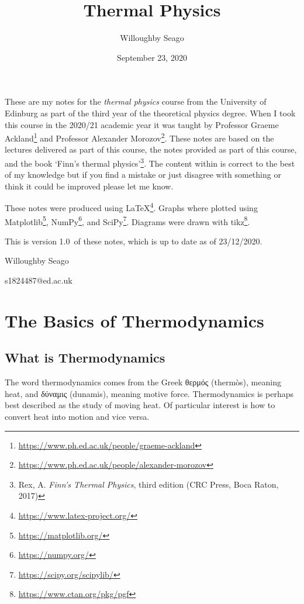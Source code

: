 \documentclass[a4paper]{article}
\author{Willoughby Seago}
\date{September 23, 2020}
\title{Thermal Physics}
\newcommand{\notesVersion}{1.0}
\newcommand{\notesDate}{23/12/2020}
\begin{document}
    \maketitle
    These are my notes for the \textit{thermal physics} course from the University of Edinburg as part of the third year of the theoretical physics degree.
    When I took this course in the 2020/21 academic year it was taught by Professor Graeme Ackland\footnote{\url{https://www.ph.ed.ac.uk/people/graeme-ackland}} and Professor Alexander Morozov\footnote{\url{https://www.ph.ed.ac.uk/people/alexander-morozov}}.
    These notes are based on the lectures delivered as part of this course, the notes provided as part of this course, and the book `Finn's thermal physics'\footnote{Rex, A. \textit{Finn's Thermal Physics}, third edition (CRC Press, Boca Raton, 2017)}.
    The content within is correct to the best of my knowledge but if you find a mistake or just disagree with something or think it could be improved please let me know.
    
    These notes were produced using \LaTeX\footnote{\url{https://www.latex-project.org/}}.
    Graphs where plotted using Matplotlib\footnote{\url{https://matplotlib.org/}}, NumPy\footnote{\url{https://numpy.org/}}, and SciPy\footnote{\url{https://scipy.org/scipylib/}}.
    Diagrams were drawn with tikz\footnote{\url{https://www.ctan.org/pkg/pgf}}.
    
    This is version \notesVersion~of these notes, which is up to date as of \notesDate.
    \begin{flushright}
        Willoughby Seago
        
        s1824487@ed.ac.uk
    \end{flushright}
    \clearpage
    \tableofcontents
    \listoffigures
    \listoftables
    \printglossary[type=\acronymtype, title=Acronyms, style=long]
    \clearpage
    \begingroup
    \let\clearpage\relax  %
    \endgroup
    \section{The Basics of Thermodynamics}
    \subsection{What is Thermodynamics}
    The word thermodynamics comes from the Greek \textgreek{θερμός} (therm\`os), meaning heat, and \textgreek{δύναμις} (dunamis), meaning motive force.
    Thermodynamics is perhaps best described as the study of moving heat.
    Of particular interest is how to convert heat into motion and vice versa.
    
\end{document}

